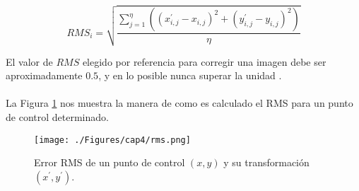  \begin{equation}
 RMS_{i} = \sqrt{\dfrac{\sum_{j=1}^{\eta} ((x_{i,j}^{'}-x_{i,j})^{2}+(y_{i,j}^{'}-y_{i,j})^{2})}{\eta}}
 \end{equation} 

 	El valor de $ RMS $ elegido por referencia para corregir una imagen debe ser aproximadamente $ 0.5 $, y en lo posible nunca superar la unidad \cite{guide1999erdas}. \\~\\
 	La Figura \ref{fig:rms} nos muestra la manera de como es calculado el RMS para un punto de control determinado.
 
 
     \begin{figure}[H]
     	\centering
     	\texttt{[image: ./Figures/cap4/rms.png]}
     	\caption{Error RMS de un punto de control $ (x,y) $ y su transformaci\'on $ (x^{'},y^{'}) $.}
     	\label{fig:rms}
     \end{figure}



